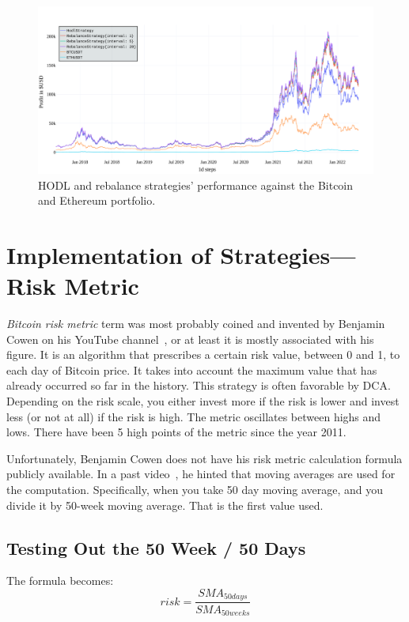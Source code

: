 \begin{figure}[!t]
    \centering
    \includegraphics[width=\columnwidth]{figures/benchmark.pdf}
    \caption{HODL and rebalance strategies' performance against the Bitcoin and Ethereum portfolio.}
    \label{figure-benchmark}
\end{figure}


\section{Implementation of Strategies---Risk Metric}
\label{section-strategies}
\emph{Bitcoin risk metric} term was most probably coined and invented by Benjamin Cowen on his YouTube channel~\cite{youtube:cowen-yt-channel}, or at least it is mostly associated with his figure. It is an algorithm that prescribes a certain risk value, between 0 and 1, to each day of Bitcoin price. It takes into account the maximum value that has already occurred so far in the history. This strategy is often favorable by DCA. Depending on the risk scale, you either invest more if the risk is lower and invest less (or not at all) if the risk is high. The metric oscillates between highs and lows. There have been 5 high points of the metric since the year 2011.

Unfortunately, Benjamin Cowen does not have his risk metric calculation formula publicly available. In a past video~\cite{youtube:cowen-moving-average}, he hinted that moving averages are used for the computation. Specifically, when you take 50 day moving average, and you divide it by 50-week moving average. That is the first value used.

\subsection*{Testing Out the 50 Week / 50 Days}
\label{subsection-50week50days}
The formula becomes:
$$risk = \frac{\mathit{SMA}_{50 days}}{\mathit{SMA}_{50 weeks}}$$

